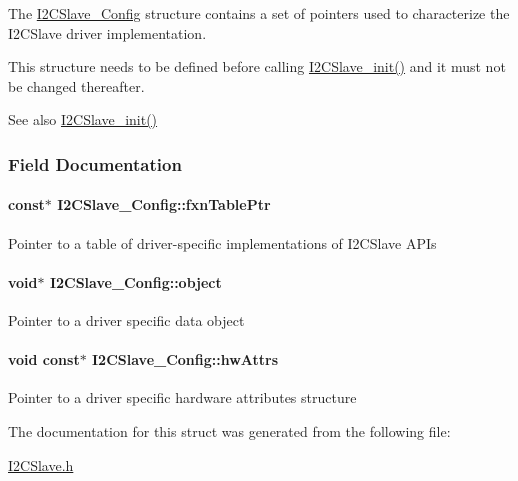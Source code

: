 The \hyperlink{struct_i2_c_slave___config}{I2\+C\+Slave\+\_\+\+Config} structure contains a set of pointers used to characterize the I2\+C\+Slave driver implementation.

This structure needs to be defined before calling \hyperlink{_i2_c_slave_8h_ad7518283a3f3fb80cefe6cb7ca7a4a36}{I2\+C\+Slave\+\_\+init()} and it must not be changed thereafter.

\begin{DoxySeeAlso}{See also}
\hyperlink{_i2_c_slave_8h_ad7518283a3f3fb80cefe6cb7ca7a4a36}{I2\+C\+Slave\+\_\+init()} 
\end{DoxySeeAlso}


\subsubsection{Field Documentation}
\paragraph[{fxn\+Table\+Ptr}]{ const$\ast$ I2\+C\+Slave\+\_\+\+Config\+::fxn\+Table\+Ptr}\label{struct_i2_c_slave___config_aa62c3bfdc643859d8ab88853a91ba4b5}
Pointer to a table of driver-\/specific implementations of I2\+C\+Slave A\+P\+Is 
\paragraph[{object}]{\setlength{\rightskip}{0pt plus 5cm}void$\ast$ I2\+C\+Slave\+\_\+\+Config\+::object}\label{struct_i2_c_slave___config_af79eb80d326365396c1f61e94fa3accf}
Pointer to a driver specific data object 
\paragraph[{hw\+Attrs}]{\setlength{\rightskip}{0pt plus 5cm}void const$\ast$ I2\+C\+Slave\+\_\+\+Config\+::hw\+Attrs}\label{struct_i2_c_slave___config_a436198a1c0b643e5517ea05739bd8bcd}
Pointer to a driver specific hardware attributes structure 

The documentation for this struct was generated from the following file\+:\begin{DoxyCompactItemize}
\item 
\hyperlink{_i2_c_slave_8h}{I2\+C\+Slave.\+h}\end{DoxyCompactItemize}
